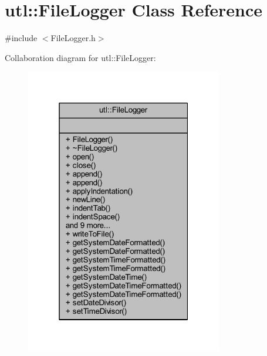 \hypertarget{classutl_1_1_file_logger}{}\section{utl\+:\+:File\+Logger Class Reference}
\label{classutl_1_1_file_logger}


{\ttfamily \#include $<$File\+Logger.\+h$>$}



Collaboration diagram for utl\+:\+:File\+Logger\+:\nopagebreak
\begin{figure}[H]
\begin{center}
\leavevmode
\includegraphics[width=244pt]{classutl_1_1_file_logger__coll__graph}
\end{center}
\end{figure}
